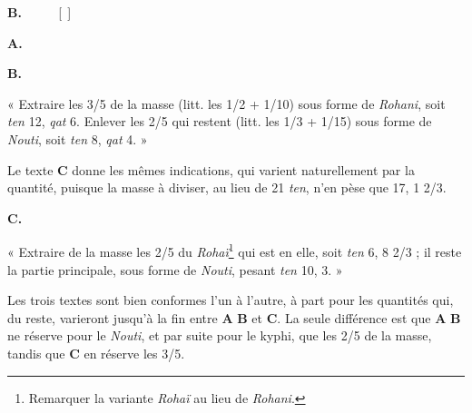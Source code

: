 \documentclass[a4paper, 11pt, oneside]{article}
\newcommand*\hieroAAAB{}
\newcommand*\hieroAAAM{}
\newcommand*\hieroAABT{}
\newcommand*\hieroAACQ{}
\newcommand*\hieroAACY{}
\newcommand*\hieroAADL{}
\newcommand*\hieroAADT{}
\newcommand*\hieroAAFD{}
\newcommand*\hieroAAFT{}
\newcommand*\hieroAAGA{}
\newcommand*\hieroAAGN{}
\newcommand*\hieroAAGP{}
\newcommand*\hieroAAHJ{}
\newcommand*\hieroAAHK{}
\newcommand*\hieroAAHW{}
\newcommand*\hieroAAIG{}
\newcommand*\hieroAAIJ{}
\newcommand*\hieroAAIO{}
\newcommand*\hieroAAIP{}
\newcommand*\hieroAAIT{}
\newcommand*\hieroAAIU{}
\newcommand*\hieroAAIW{}
\newcommand*\hieroAAIX{}
\newcommand*\hieroAAIY{}
\newcommand*\hieroAAIZ{}
\newcommand*\hieroAAJA{}
\newcommand*\hieroAAJB{}
\newcommand*\hieroAAJC{}
\newcommand*\hieroAAJD{}
\newcommand*\hieroAAJE{}
\newcommand*\hieroAAJF{}
\newcommand*\hieroAAJG{}
\newcommand*\hieroAAJH{}
\newcommand*\hieroAAJI{}
\newcommand*\hieroAAJJ{}
\newcommand*\hieroAAJK{}
\newcommand*\hieroAAJL{}
\newcommand*\hieroAAJM{\raisebox{1ex}{}}
\newcommand*\hieroAAJN{}
\newcommand*\hieroAAJO{}
\newcommand*\hieroAAJP{}
\newcommand*\hieroAAJQ{}
\newcommand*\hieroAAJR{}
\newcommand*\hieroAAJS{}
\newcommand*\hieroAAJT{}
\newcommand*\hieroAAJU{}
\newcommand*\hieroAAJV{}
\newcommand*\hieroAAJW{}
\newcommand*\hieroAAJX{}
\begin{document}
\hspace*{10mm}\textbf{B.}\hspace*{5mm} $\hieroAACQ\:\hieroAAIW\:\hieroAAIX\:\hieroAADT\:\hieroAADL\:\hieroAAIP\:\hieroAAIY\:\hieroAAIZ\:\hieroAAAM\:\hieroAAAM\:\hieroAADL$ [$\hieroAABT\:\hieroAAGN\:\hieroAAFT$] $\hieroAAIU\:\hieroAAJA\:\hieroAAJB\:\hieroAAJC$

\hspace*{10mm}\textbf{A.}\hspace*{5mm} $\hieroAAIJ\:\hieroAAJD\:\hieroAAHK\:\hieroAAJE\:\hieroAAGP\:\hieroAAJF\:\hieroAAIT\:\hieroAAJG\:\hieroAAGA\:\hieroAAJH$

\hspace*{10mm}\textbf{B.}\hspace*{5mm} $\hieroAAJI\:\hieroAAJJ\:\hieroAAJK\:\hieroAAGP\:\hieroAAAM\:\hieroAAAM\:\hieroAADL\:\hieroAABT\:\hieroAAGN\:\hieroAAFT\:\hieroAAJL\:\hieroAAGA\:\hieroAAJB\:\hieroAAJH$

« Extraire les 3/5 de la masse (litt. les 1/2 + 1/10) sous forme de \emph{Rohani}, soit \emph{ten} 12, \emph{qat} 6. Enlever les 2/5 qui restent (litt. les 1/3 + 1/15) sous forme de \emph{Nouti}, soit \emph{ten} 8, \emph{qat} 4. »

Le texte \textbf{C} donne les mêmes indications, qui varient naturellement par la quantité, puisque la masse à diviser, au lieu de 21 \emph{ten}, n'en pèse que 17, 1 2/3.

\hspace*{10mm}\textbf{C.}\hspace*{5mm} $\hieroAAJM\:\hieroAAIO\:\hieroAAJN\:\hieroAAJO\:\hieroAAJP\:\hieroAAJQ\:\hieroAAAB\:\hieroAAAM\:\hieroAAAM\:\hieroAAHW\:\hieroAAJR\:\hieroAAJS\:\hieroAAJT\:\hieroAAGA\\\hieroAAJU\:\hieroAAJV\:\hieroAAIG\:\hieroAAJW\:\hieroAAGP\:\hieroAACY\:\hieroAAAM\:\hieroAAAM\:\hieroAAHW\:\hieroAAFD\:\hieroAAJX\:\hieroAAGA\:\hieroAAHJ$

« Extraire de la masse les 2/5 du \emph{Rohaï}\footnote{Remarquer la variante \emph{Rohaï} au lieu de \emph{Rohani}.} qui est en elle, soit \emph{ten} 6, 8 2/3 ; il reste la partie principale, sous forme de \emph{Nouti}, pesant \emph{ten} 10, 3. »

Les trois textes sont bien conformes l'un à l'autre, à part pour les quantités qui, du reste, varieront jusqu'à la fin entre \textbf{A} \textbf{B} et \textbf{C}. La seule différence est que \textbf{A} \textbf{B} ne réserve pour le \emph{Nouti}, et par suite pour le kyphi, que les 2/5 de la masse, tandis que \textbf{C} en réserve les 3/5.
\end{document}
